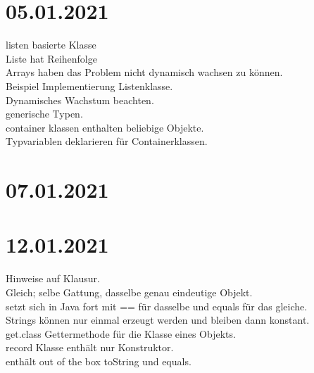 \documentclass{article}
\begin{document}
	\section*{05.01.2021}
	listen basierte Klasse \\
	Liste hat Reihenfolge \\
	Arrays haben das Problem nicht dynamisch wachsen zu können. \\
	Beispiel Implementierung Listenklasse. \\
	Dynamisches Wachstum beachten. \\
	generische Typen. \\
	container klassen enthalten beliebige Objekte. \\
	Typvariablen deklarieren für Containerklassen. \\
	\section*{07.01.2021}
	\section*{12.01.2021}
	Hinweise auf Klausur. \\
	Gleich; selbe Gattung, dasselbe genau eindeutige Objekt. \\
	setzt sich in Java fort mit == für dasselbe und equals für das gleiche. \\
	Strings können nur einmal erzeugt werden und bleiben dann konstant. \\
	get.class Gettermethode für die Klasse eines Objekts. \\
	record Klasse enthält nur Konstruktor. \\
	enthält out of the box toString und equals. \\
\end{document}
